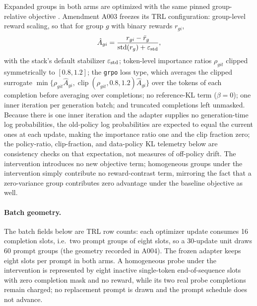 \documentclass[11pt]{article}
\begin{document}
Expanded groups in both arms are optimized with the same pinned group-relative objective \citep{shao2024deepseekmath, vonwerra2020trl}. Amendment A003 freezes its TRL configuration: group-level reward scaling, so that for group $g$ with binary rewards $r_{gi}$,
\begin{equation}
\hat A_{gi}=\frac{r_{gi}-\bar r_g}{\operatorname{std}(r_g)+\varepsilon_{\rm std}},
\label{eq:adv}
\end{equation}
with the stack's default stabilizer $\varepsilon_{\rm std}$; token-level importance ratios $\rho_{git}$ clipped symmetrically to $[0.8,1.2]$; the \texttt{grpo} loss type, which averages the clipped surrogate $\min\{\rho_{git}\hat A_{gi},\operatorname{clip}(\rho_{git},0.8,1.2)\hat A_{gi}\}$ over the tokens of each completion before averaging over completions; no reference-KL term ($\beta=0$); one inner iteration per generation batch; and truncated completions left unmasked. Because there is one inner iteration and the adapter supplies no generation-time log probabilities, the old-policy log probabilities are expected to equal the current ones at each update, making the importance ratio one and the clip fraction zero; the policy-ratio, clip-fraction, and data-policy KL telemetry below are consistency checks on that expectation, not measures of off-policy drift. The intervention introduces no new objective term; homogeneous groups under the intervention simply contribute no reward-contrast term, mirroring the fact that a zero-variance group contributes zero advantage under the baseline objective as well.

\paragraph{Batch geometry.} The batch fields below are TRL row counts: each optimizer update consumes 16 completion slots, i.e.\ two prompt groups of eight slots, so a 30-update unit draws 60 prompt groups (the geometry recorded in A004). The frozen adapter keeps eight slots per prompt in both arms. A homogeneous probe under the intervention is represented by eight inactive single-token end-of-sequence slots with zero completion mask and no reward, while its two real probe completions remain charged; no replacement prompt is drawn and the prompt schedule does not advance.
\end{document}
